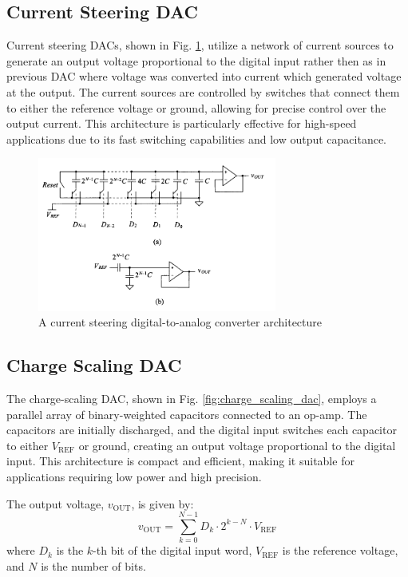 \subsection{Current Steering DAC}
Current steering DACs, shown in Fig. \ref{fig:current_steering_dac}, utilize a network of current sources to generate an output voltage proportional to the digital input rather then as in previous DAC where voltage was converted into current which generated voltage at the output. The current sources are controlled by switches that connect them to either the reference voltage or ground, allowing for precise control over the output current. This architecture is particularly effective for high-speed applications due to its fast switching capabilities and low output capacitance.
\begin{figure}
	\centering
	\includegraphics[width=0.7\textwidth]{figs/current_steering_dac.png}
	\caption{A current steering digital-to-analog converter architecture}
	\label{fig:current_steering_dac}
	\vspace{0.5cm}
\end{figure}
\subsection{Charge Scaling DAC}
The charge-scaling DAC, shown in Fig. \ref{fig:charge_scaling_dac}, employs a parallel array of binary-weighted capacitors connected to an op-amp. The capacitors are initially discharged, and the digital input switches each capacitor to either $V_{\text{REF}}$ or ground, creating an output voltage proportional to the digital input. This architecture is compact and efficient, making it suitable for applications requiring low power and high precision.

The output voltage, $v_{\text{OUT}}$, is given by:
\begin{equation}
v_{\text{OUT}} = \sum_{k=0}^{N-1} D_k \cdot 2^{k-N} \cdot V_{\text{REF}}
\end{equation}
where $D_k$ is the $k$-th bit of the digital input word, $V_{\text{REF}}$ is the reference voltage, and $N$ is the number of bits.

